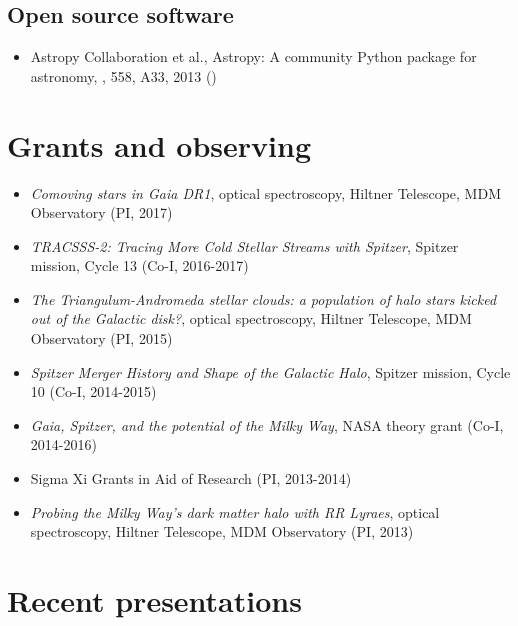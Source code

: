 \documentclass[12pt,letterpaper]{article}
\begin{document}
    \subsection*{Open source software}
    \begin{itemize}

\item Astropy Collaboration et al.,
    {Astropy: A community Python package for astronomy},
    \aanda, 558, A33, 2013 ()

	\end{itemize}

\section*{Grants and observing }

	\begin{itemize}
    \item {\it Comoving stars in Gaia DR1}, optical spectroscopy, Hiltner Telescope, MDM Observatory (PI, 2017)
    \item {\it TRACSSS-2: Tracing More Cold Stellar Streams with Spitzer}, Spitzer mission, Cycle 13 (Co-I, 2016-2017)
	\item {\it The Triangulum-Andromeda stellar clouds: a population of halo stars kicked out of the Galactic disk?}, optical spectroscopy, Hiltner Telescope, MDM Observatory (PI, 2015)
	\item {\it Spitzer Merger History and Shape of the Galactic Halo}, Spitzer mission, Cycle 10 (Co-I, 2014-2015)
	\item {\it Gaia, Spitzer, and the potential of the Milky Way}, NASA theory grant (Co-I, 2014-2016)
	\item Sigma Xi Grants in Aid of Research (PI, 2013-2014)
	\item {\it Probing the Milky Way's dark matter halo with RR Lyraes}, optical spectroscopy, Hiltner Telescope, MDM Observatory (PI, 2013)
	\end{itemize}

\section*{Recent presentations}
\end{document}
